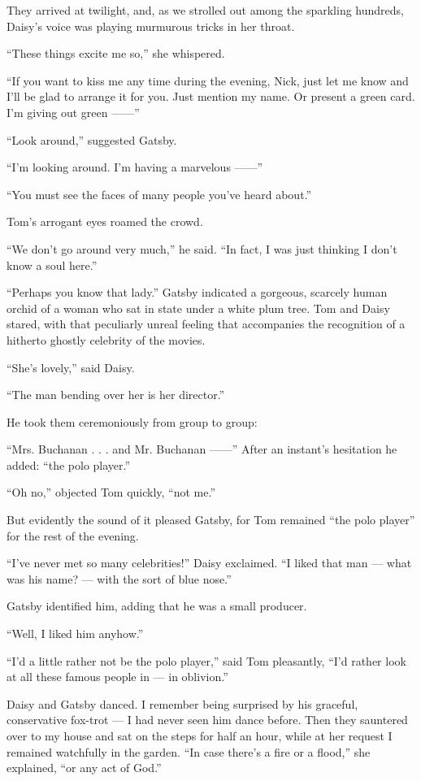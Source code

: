 \documentclass{znotebook}
\begin{document}
They arrived at twilight, and, as we strolled out among the sparkling hundreds, Daisy's voice was playing murmurous tricks in her throat.

``These things excite me so,'' she whispered.

``If you want to kiss me any time during the evening, Nick, just let me know and I'll be glad to arrange it for you. Just mention my name. Or present a green card. I'm giving out green ——''

``Look around,'' suggested Gatsby.

``I'm looking around. I'm having a marvelous ——''

``You must see the faces of many people you've heard about.''

Tom's arrogant eyes roamed the crowd.

``We don't go around very much,'' he said. ``In fact, I was just thinking I don't know a soul here.''

``Perhaps you know that lady.'' Gatsby indicated a gorgeous, scarcely human orchid of a woman who sat in state under a white plum tree. Tom and Daisy stared, with that peculiarly unreal feeling that accompanies the recognition of a hitherto ghostly celebrity of the movies.

``She's lovely,'' said Daisy.

``The man bending over her is her director.''

He took them ceremoniously from group to group:

``Mrs. Buchanan . . . and Mr. Buchanan ——'' After an instant's hesitation he added: ``the polo player.''

``Oh no,'' objected Tom quickly, ``not me.''

But evidently the sound of it pleased Gatsby, for Tom remained ``the polo player'' for the rest of the evening.

``I've never met so many celebrities!'' Daisy exclaimed. ``I liked that man — what was his name? — with the sort of blue nose.''

Gatsby identified him, adding that he was a small producer.

``Well, I liked him anyhow.''

``I'd a little rather not be the polo player,'' said Tom pleasantly, ``I'd rather look at all these famous people in — in oblivion.''

Daisy and Gatsby danced. I remember being surprised by his graceful, conservative fox-trot — I had never seen him dance before. Then they sauntered over to my house and sat on the steps for half an hour, while at her request I remained watchfully in the garden. ``In case there's a fire or a flood,'' she explained, ``or any act of God.''
\end{document}
